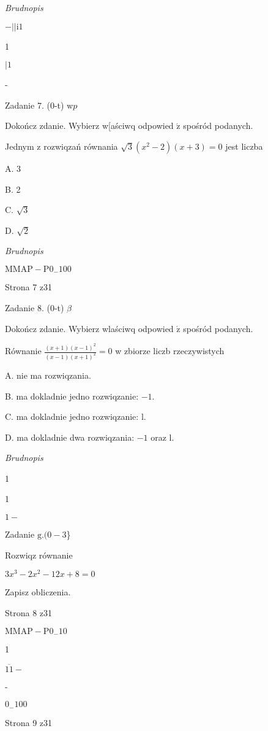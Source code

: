 \documentclass[a4paper,12pt]{article}
\begin{document}
{\it Brudnopis}

$-||\mathrm{i}1$

1

$| 1$

-

Zadanie 7. (0-t) $\mathrm{w} p$

Dokończ zdanie. Wybierz w[aściwq odpowied $\acute{\mathrm{z}}$ spośród podanych.

Jednym z rozwiqzań równania $\sqrt{3}(x^{2}-2)(x+3)=0$ jest liczba

A. 3

B. 2

C. $\sqrt{3}$

D. $\sqrt{2}$

{\it Brudnopis}

$\mathrm{M}\mathrm{M}\mathrm{A}\mathrm{P}-\mathrm{P}0_{-}100$

Strona 7 z31





Zadanie 8. (0-t) $\beta$

Dokończ zdanie. Wybierz wlaściwq odpowied $\acute{\mathrm{z}}$ spośród podanych.

Równanie $\displaystyle \frac{(x+1)(x-1)^{2}}{(x-1)(x+1)^{2}}=0$ w zbiorze liczb rzeczywistych

A. nie ma rozwiqzania.

B. ma dokladnie jedno rozwiqzanie: $-1.$

C. ma dokladnie jedno rozwiqzanie: l.

D. ma dokladnie dwa rozwiqzania: $-1$ oraz l.

{\it Brudnopis} 

1

1

$1-$

Zadanie $\mathrm{g}. (0-3$\}

Rozwiqz równanie

$3x^{3}-2x^{2}-12x+8=0$

Zapisz obliczenia.

Strona 8 z31

$\mathrm{M}\mathrm{M}\mathrm{A}\mathrm{P}-\mathrm{P}0_{-}10$





1

$\overline{11}-$

-

$0_{-}100$

Strona 9 z31
\end{document}
